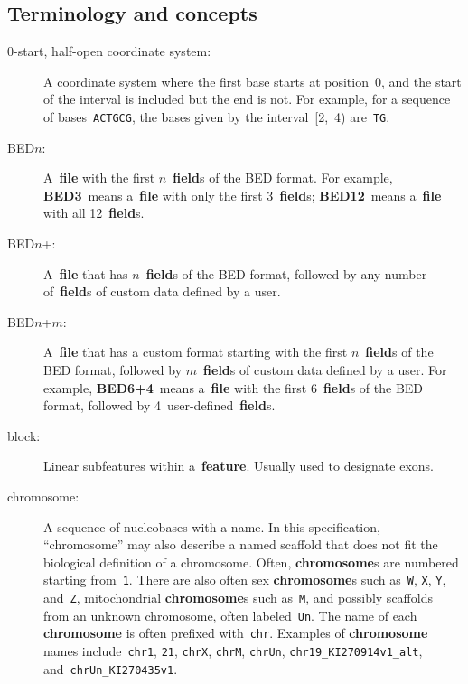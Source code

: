 \documentclass[11pt]{article}
\begin{document}
\subsection{Terminology and concepts}\label{sec:terms}
\begin{description}
\item[0-start, half-open coordinate system:]
  A coordinate system where the first base starts at position~0, and the start of the interval is included but the end is not.
  For example, for a sequence of bases~\texttt{ACTGCG}, the bases given by the interval~[2,~4) are~\texttt{TG}. %

\item[BED$n$:]
  A~\textbf{file} with the first $n$~\textbf{field}s of the \ac{BED} format.
  For example, \textbf{BED3}~means a~\textbf{file} with only the first 3~\textbf{field}s; \textbf{BED12}~means a~\textbf{file} with all 12~\textbf{field}s.

\item[BED$n$+:]
  A~\textbf{file} that has $n$~\textbf{field}s of the \ac{BED} format, followed by any number of~\textbf{field}s of custom data defined by a user.

\item[BED$n$+$m$:]
  A~\textbf{file} that has a custom format starting with the first $n$~\textbf{field}s of the \ac{BED} format, followed by $m$~\textbf{field}s of custom data defined by a user.
  For example, \textbf{BED6+4}~means a~\textbf{file} with the first 6~\textbf{field}s of the \ac{BED} format, followed by 4~user-defined~\textbf{field}s.

\item[block:]
  Linear subfeatures within a~\textbf{feature}.
  Usually used to designate exons.

\item[chromosome:]
  A sequence of nucleobases with a name.
  In this specification, ``chromosome'' may also describe a named scaffold that does not fit the biological definition of a chromosome.
  Often, \textbf{chromosome}s are numbered starting from~\texttt{1}.
  There are also often sex \textbf{chromosome}s such as~\texttt{W}, \texttt{X}, \texttt{Y}, and~\texttt{Z}, mitochondrial \textbf{chromosome}s such as~\texttt{M}, and possibly scaffolds from an unknown chromosome, often labeled~\texttt{Un}.
  The name of each \textbf{chromosome} is often prefixed with~\texttt{chr}.
  Examples of \textbf{chromosome} names include~\texttt{chr1}, \texttt{21}, \texttt{chrX}, \texttt{chrM}, \texttt{chrUn}, \texttt{chr19\_KI270914v1\_alt}, and~\texttt{chrUn\_KI270435v1}.


\end{description}
\end{document}
